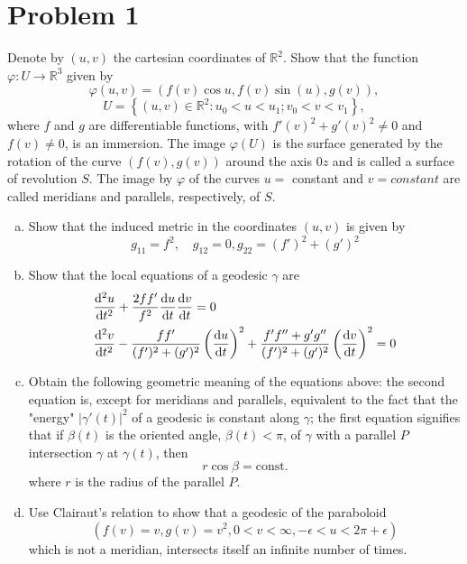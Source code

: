 \documentclass[a4paper]{article}
\begin{document}
\section*{Problem 1}%

Denote by $(u,v)$ the cartesian coordinates of $\mathds{R}^2$. Show that the function $\varphi: U \rightarrow \mathds{R}^3$ given by 
\[
  \varphi(u,v) = (f(v) \cos u, f(v) \sin(u), g(v)),
\]
\[
  U = \left\{ (u,v) \in \mathds{R}^2: u_0 < u < u_1; v_0 < v < v_1 \right\},
\]
where $f$ and $g$ are differentiable functions, with $f'(v)^2 + g'(v)^2 \neq 0$ and $f(v) \neq 0$, is an immersion. The image $\varphi(U)$ is the surface generated by the rotation of the curve $(f(v), g(v))$ around the axis $0z$ and is called a surface of revolution $S$. The image by $\varphi$ of the curves $u = $ constant and $v = constant$ are called meridians and parallels, respectively, of $S$.
\begin{enumerate}[a)]
  \item Show that the induced metric in the coordinates $(u,v)$ is given by 
    \[
      g_{11} = f^2, \quad g_{12} = 0, g_{22} = (f')^2 + (g')^2
    \]
  \item Show that the local equations of a geodesic $\gamma$ are
    \[
      \begin{aligned}
        &\dv[2]{u}{t} + \frac{2 ff'}{f^2} \dv{u}{t} \dv{v}{t} = 0 \\
        &\dv[2]{v}{t} - \frac{ff'}{(f')^2 + (g')^2} \left( \dv{u}{t} \right)^2 + \frac{f'f'' + g'g''}{(f')^2 + (g')^2} \left( \dv{v}{t} \right)^2 = 0
      \end{aligned}
    \]
  \item Obtain the following geometric meaning of the equations above: the second equation is, except for meridians and parallels, equivalent to the fact that the "energy" $|\gamma'(t)|^2$ of a geodesic is constant along $\gamma$; the first equation signifies that if $\beta(t)$ is the oriented angle, $\beta(t) < \pi$, of $\gamma$ with a parallel $P$ intersection $\gamma$ at $\gamma(t)$, then 
    \[
      r \cos \beta = \text{const.}
    \]
    where $r$ is the radius of the parallel $P$.
  \item Use Clairaut's relation to show that a geodesic of the paraboloid
    \[
      (f(v) = v, g(v) = v^2, 0 < v < \infty, -\epsilon < u < 2\pi + \epsilon)
    \]
    which is not a meridian, intersects itself an infinite number of times.
\end{enumerate}
\end{document}
